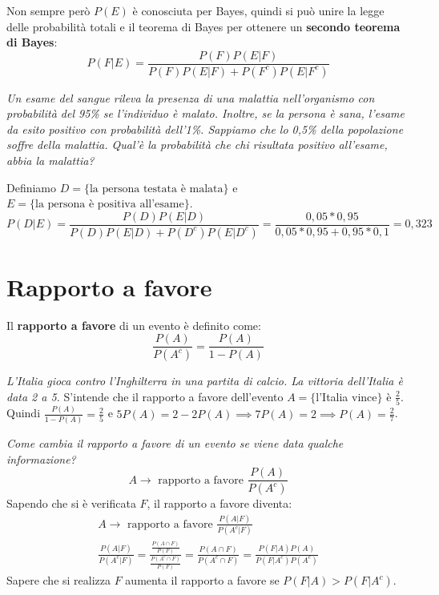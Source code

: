 Non sempre però $P(E)$ è conosciuta per Bayes, quindi si può unire la legge delle probabilità totali e il teorema di Bayes per ottenere un \textbf{secondo teorema di Bayes}:
\begin{equation*}
    P(F|E)=\frac{P(F)P(E|F)}{P(F)P(E|F)+P(F^c)P(E|F^c)}
\end{equation*}

\begin{Example}{}{}
    \textit{Un esame del sangue rileva la presenza di una malattia nell'organismo con probabilità del 95\% se l'individuo è malato. Inoltre, se la persona è sana, l'esame da esito positivo con probabilità dell'1\%. Sappiamo che lo 0,5\% della popolazione soffre della malattia. Qual'è la probabilità che chi risultata positivo all'esame, abbia la malattia?}

    Definiamo $D=\{\mbox{la persona testata è malata}\}$ e $E=\{\mbox{la persona è positiva all'esame}\}$.
    \begin{equation*}
        P(D|E)=\frac{P(D)P(E|D)}{P(D)P(E|D)+P(D^c)P(E|D^c)}=\frac{0,05*0,95}{0,05*0,95+0,95*0,1}=0,323
    \end{equation*}
\end{Example}

\section{Rapporto a favore}
\begin{redbar}
    Il \textbf{rapporto a favore} di un evento è definito come:
    \begin{equation*}
        \frac{P(A)}{P(A^c)}=\frac{P(A)}{1-P(A)}
    \end{equation*}
\end{redbar}

\begin{Example}{}{}
    \textit{L'Italia gioca contro l'Inghilterra in una partita di calcio. La vittoria dell'Italia è data 2 a 5.} S'intende che il rapporto a favore dell'evento $A=\{$l'Italia vince$\}$ è $\frac{2}{5}$. Quindi $\frac{P(A)}{1-P(A)}=\frac{2}{5}$ e $5P(A)=2-2P(A)\implies7P(A)=2\implies P(A)=\frac{2}{7}$.
\end{Example}

\textit{Come cambia il rapporto a favore di un evento se viene data qualche informazione?}
\begin{equation*}
    A\rightarrow \mbox{ rapporto a favore }\frac{P(A)}{P(A^c)}
\end{equation*}
Sapendo che si è verificata $F$, il rapporto a favore diventa:
\begin{gather*}
    A\rightarrow \mbox{ rapporto a favore }\frac{P(A|F)}{P(A^c|F)}\\
    \frac{P(A|F)}{P(A^c|F)}=\frac{\frac{P(A\cap F)}{P(F)}}{\frac{P(A^c\cap F)}{P(F)}}=\frac{P(A\cap F)}{P(A^c\cap F)}=\frac{P(F|A)P(A)}{P(F|A^c)P(A^c)}
\end{gather*}
Sapere che si realizza $F$ aumenta il rapporto a favore se $P(F|A)>P(F|A^c)$.

